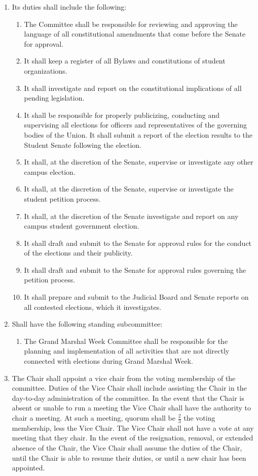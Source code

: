\documentclass{bylaws}
\begin{document}
\begin{enumerate}
\begin{enumerate}
\item Its duties shall include the following:
\begin{enumerate}
\item The Committee shall be responsible for reviewing and approving the language of all constitutional amendments that
come before the Senate for approval.
\item It shall keep a register of all Bylaws and constitutions of student organizations.
\item It shall investigate and report on the constitutional implications of all pending legislation. 
\item It shall be responsible for properly publicizing, conducting and supervising all elections for officers and
representatives of the governing bodies of the Union. It shall submit a report of the election results to the Student
Senate following the election.
\item It shall, at the discretion of the Senate, supervise or investigate any other campus election.
\item It shall, at the discretion of the Senate, supervise or investigate the student petition process.
\item It shall, at the discretion of the Senate investigate and report on any campus student government election.
\item It shall draft and submit to the Senate for approval rules for the conduct of the elections and their publicity.
\item It shall draft and submit to the Senate for approval rules governing the petition process.
\item It shall prepare and submit to the Judicial Board and Senate reports on all contested elections, which it investigates.
\end{enumerate}

\item Shall have the following standing subcommittee:
\begin{enumerate}
\item The Grand Marshal Week Committee shall be responsible for the planning and implementation of all activities that
are not directly connected with elections during Grand Marshal Week.
\end{enumerate}

\item The Chair shall appoint a vice chair from the voting membership of the committee. Duties of the Vice Chair shall include
assisting the Chair in the day-to-day administration of the committee. In the event that the Chair is absent or unable to run a
meeting the Vice Chair shall have the authority to chair a meeting. At such a meeting, quorum shall be $\frac{2}{3}$ the voting
membership, less the Vice Chair. The Vice Chair shall not have a vote at any meeting that they chair. In the event of the
resignation, removal, or extended absence of the Chair, the Vice Chair shall assume the duties of the Chair, until the Chair
is able to resume their duties, or until a new chair has been appointed.
\end{enumerate}


\end{enumerate}
\end{document}
